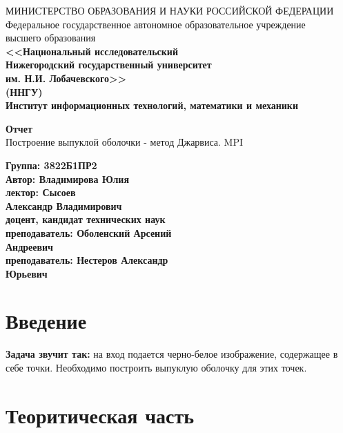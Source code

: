 \documentclass[a4paper]{article}
\begin{document}
\begin{titlepage}
    \centering
    {\Large МИНИСТЕРСТВО ОБРАЗОВАНИЯ И НАУКИ РОССИЙСКОЙ ФЕДЕРАЦИИ \\[1em]
    Федеральное государственное автономное образовательное учреждение  \\[1em]
    высшего образования \\[1em]
    \textbf{<<Национальный исследовательский \\ Нижегородский государственный университет \\ 
    им. Н.И. Лобачевского>> \\ (ННГУ) \\[1em]
    Институт информационных технологий, математики и механики}}
    
    \vspace{1cm}
    {\Huge \textbf{Отчет} \\[1em]
    Построение выпуклой оболочки - метод Джарвиса. MPI}
    
    \vspace{1cm}
    \raggedleft
    {\textbf{Группа: 3822Б1ПР2 \\ Автор: Владимирова Юлия\\лектор: Сысоев\\ Александр Владимирович\\ доцент, кандидат технических наук\\преподаватель: Оболенский Арсений\\ Андреевич\\преподаватель: Нестеров Александр\\ Юрьевич\\}}
        \vspace{2cm}
\end{titlepage}

\section{Введение}
\hspace{1cm}{Данный документ является отчетом к лабораторной работе №3 по предмету <<Параллельное программирование>>}

\textbf{Задача звучит так:} на вход подается черно-белое изображение, содержащее в себе точки. Необходимо построить выпуклую оболочку для этих точек.



\section{Теоритическая часть}
\end{document}
